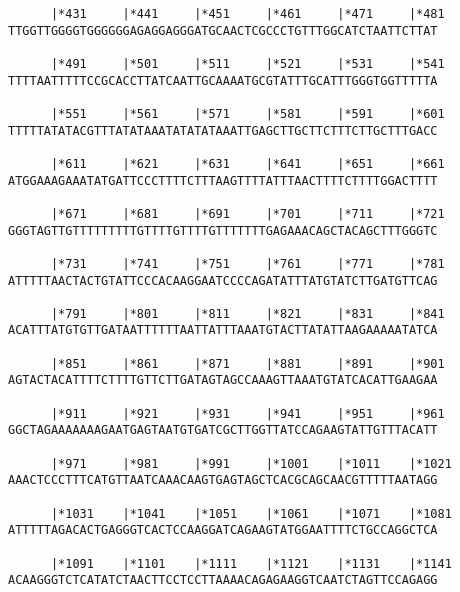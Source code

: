 \documentclass{article}
\begin{document}
\begin{Verbatim}
      |*431     |*441     |*451     |*461     |*471     |*481
TTGGTTGGGGTGGGGGGAGAGGAGGGATGCAACTCGCCCTGTTTGGCATCTAATTCTTAT
                                                            
      |*491     |*501     |*511     |*521     |*531     |*541
TTTTAATTTTTCCGCACCTTATCAATTGCAAAATGCGTATTTGCATTTGGGTGGTTTTTA
                                                            
      |*551     |*561     |*571     |*581     |*591     |*601
TTTTTATATACGTTTATATAAATATATATAAATTGAGCTTGCTTCTTTCTTGCTTTGACC
                                                            
      |*611     |*621     |*631     |*641     |*651     |*661
ATGGAAAGAAATATGATTCCCTTTTCTTTAAGTTTTATTTAACTTTTCTTTTGGACTTTT
                                                            
      |*671     |*681     |*691     |*701     |*711     |*721
GGGTAGTTGTTTTTTTTTGTTTTGTTTTGTTTTTTTGAGAAACAGCTACAGCTTTGGGTC
                                                            
      |*731     |*741     |*751     |*761     |*771     |*781
ATTTTTAACTACTGTATTCCCACAAGGAATCCCCAGATATTTATGTATCTTGATGTTCAG
                                                            
      |*791     |*801     |*811     |*821     |*831     |*841
ACATTTATGTGTTGATAATTTTTTAATTATTTAAATGTACTTATATTAAGAAAAATATCA
                                                            
      |*851     |*861     |*871     |*881     |*891     |*901
AGTACTACATTTTCTTTTGTTCTTGATAGTAGCCAAAGTTAAATGTATCACATTGAAGAA
                                                            
      |*911     |*921     |*931     |*941     |*951     |*961
GGCTAGAAAAAAAGAATGAGTAATGTGATCGCTTGGTTATCCAGAAGTATTGTTTACATT
                                                            
      |*971     |*981     |*991     |*1001    |*1011    |*1021
AAACTCCCTTTCATGTTAATCAAACAAGTGAGTAGCTCACGCAGCAACGTTTTTAATAGG
                                                            
      |*1031    |*1041    |*1051    |*1061    |*1071    |*1081
ATTTTTAGACACTGAGGGTCACTCCAAGGATCAGAAGTATGGAATTTTCTGCCAGGCTCA
                                                            
      |*1091    |*1101    |*1111    |*1121    |*1131    |*1141
ACAAGGGTCTCATATCTAACTTCCTCCTTAAAACAGAGAAGGTCAATCTAGTTCCAGAGG
                                                            

\end{Verbatim}
\end{document}
